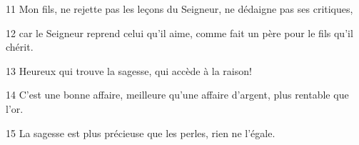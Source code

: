 
11 Mon fils, ne rejette pas les leçons du Seigneur, ne dédaigne pas ses critiques,

12 car le Seigneur reprend celui qu’il aime, comme fait un père pour le fils qu’il chérit.

13 Heureux qui trouve la sagesse, qui accède à la raison!

14 C’est une bonne affaire, meilleure qu’une affaire d’argent, plus rentable que l’or.

15 La sagesse est plus précieuse que les perles, rien ne l’égale.